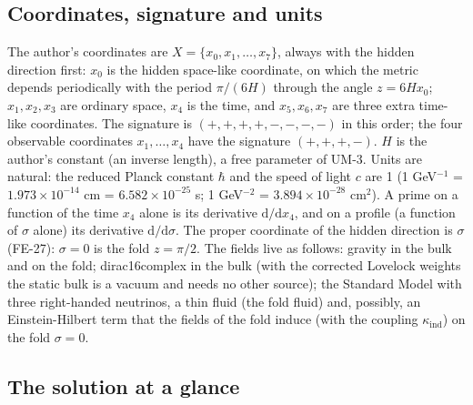 \documentclass[
  10pt,
]{article}
\begin{document}
\hypertarget{coordinates-signature-and-units}{%
\subsection{Coordinates, signature and
units}\label{coordinates-signature-and-units}}

The author's coordinates are \(X = \{x_0, x_1, \dots, x_7\}\), always
with the hidden direction first: \(x_0\) is the hidden space-like
coordinate, on which the metric depends periodically with the period
\(\pi/(6H)\) through the angle \(z = 6Hx_0\); \(x_1, x_2, x_3\) are
ordinary space, \(x_4\) is the time, and \(x_5, x_6, x_7\) are three
extra time-like coordinates. The signature is \((+,+,+,+,-,-,-,-)\) in
this order; the four observable coordinates \(x_1, \dots, x_4\) have the
signature \((+,+,+,-)\). \(H\) is the author's constant (an inverse
length), a free parameter of UM-3. Units are natural: the reduced Planck
constant \(\hbar\) and the speed of light \(c\) are 1 (1 GeV\(^{-1}\) =
\(1.973\times10^{-14}\) cm = \(6.582\times10^{-25}\) s; 1 GeV\(^{-2}\) =
\(3.894\times10^{-28}\) cm\(^2\)). A prime on a function of the time
\(x_4\) alone is its derivative \(\mathrm{d}/\mathrm{d}x_4\), and on a
profile (a function of \(\sigma\) alone) its derivative
\(\mathrm{d}/\mathrm{d}\sigma\). The proper coordinate of the hidden
direction is \(\sigma\) (FE-27): \(\sigma = 0\) is the fold
\(z = \pi/2\). The fields live as follows: gravity in the bulk and on
the fold; dirac16complex in the bulk (with the corrected Lovelock
weights the static bulk is a vacuum and needs no other source); the
Standard Model with three right-handed neutrinos, a thin fluid (the fold
fluid) and, possibly, an Einstein-Hilbert term that the fields of the
fold induce (with the coupling \(\kappa_{\mathrm{ind}}\)) on the fold
\(\sigma = 0\).

\hypertarget{the-solution-at-a-glance}{%
\subsection{The solution at a glance}\label{the-solution-at-a-glance}}
\end{document}
